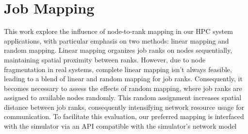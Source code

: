 \section{Job Mapping}
This work explore the influence of node-to-rank mapping in our HPC system applications, with particular emphasis on two methods: linear mapping and random mapping. Linear mapping organizes job ranks on nodes sequentially, maintaining spatial proximity between ranks. However, due to node fragmentation in real systems, complete linear mapping isn't always feasible, leading to a blend of linear and random mapping for job ranks. Consequently, it becomes necessary to assess the effects of random mapping, where job ranks are assigned to available nodes randomly. This random assignment increases spatial distance between job ranks, consequently intensifying network resource usage for communication. To facilitate this evaluation, our preferred mapping is interfaced with the simulator via an API compatible with the simulator's network model

